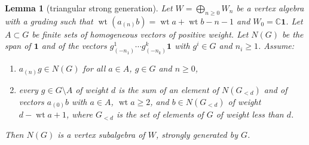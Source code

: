 \documentclass[leqno]{article}
\newcommand{\Cbb}{\ensuremath{\mathbb{C}}}
\renewcommand{\geq}{\ensuremath{\geqslant}}
\newtheorem{lemma}[thm]{Lemma}
\numberwithin{equation}{section}
\begin{document}
\begin{lemma}[triangular strong generation]
\label{lem:triangular}
Let $W = \bigoplus_{n \geq 0} W_n$ be a vertex algebra with a grading such that $\operatorname{wt}(a_{(n)}b) = \operatorname{wt}a + \operatorname{wt}b - n - 1$ and $W_0 = \Cbb\mathbf 1$. Let $A \subset G$ be finite sets of homogeneous vectors of positive weight. Let $N(G)$ be the span of $\mathbf 1$ and of the vectors $g^1_{(-n_1)}\cdots g^k_{(-n_k)}\mathbf 1$ with $g^i \in G$ and $n_i \geq 1$. Assume:
\begin{enumerate}
\item $a_{(n)}g \in N(G)$ for all $a \in A$, $g \in G$ and $n \geq 0$,
\item every $g \in G \setminus A$ of weight $d$ is the sum of an element of $N(G_{<d})$ and of vectors $a_{(0)}b$ with $a \in A$, $\operatorname{wt}a \geq 2$, and $b \in N(G_{<d})$ of weight $d - \operatorname{wt}a + 1$, where $G_{<d}$ is the set of elements of $G$ of weight less than $d$.
\end{enumerate}
Then $N(G)$ is a vertex subalgebra of $W$, strongly generated by $G$.
\end{lemma}
\end{document}
